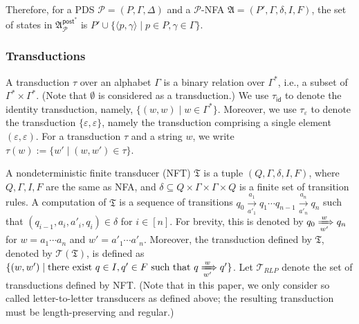 \documentclass[preprint,12pt]{elsarticle}
\newcommand\Pp{{\mathcal{P} }}
\newcommand\post{{\mathsf{post} }}
\newcommand{\id}{\mathsf{id}}
\newcommand\Aut{{\mathfrak{A} }}
\newcommand\Tran{{\mathfrak{T} }}
\newcommand\TLang{{\mathscr{T} }}
\newcommand\UTrans{{\mathscr{T}_{RLP} }}
\newcommand{\NFA}{\textsf{NFA}}
\newcommand{\NFT}{\textsf{NFT}}
\newcommand{\LTLNFT}{\textsf{L2LNFT}}
\newcommand{\tl}[1]{\color{magenta} {TL: #1 :LT} \color{black}}
\newcommand{\tl}[1]{}
\begin{document}
\smallskip

Therefore, for a PDS $\Pp=(P,\Gamma,\Delta)$ and a $\Pp$-NFA $\Aut = (P', \Gamma, \delta, I, F)$, the set of states in $\Aut^{\post^*}_\Pp$ is $P' \cup \{\langle p, \gamma \rangle \mid p \in P, \gamma \in \Gamma \}$.


\subsubsection{Transductions}
A transduction $\tau$ over an alphabet $\Gamma$ is a binary relation over $\Gamma^*$, i.e., a subset of $\Gamma^* \times \Gamma^*$. (Note that $\emptyset$ is considered as a transduction.)
We use $\tau_{\id}$ to denote the identity transduction, namely,  $\{(w,w) \mid w \in \Gamma^*\}$. 
Moreover, we use $\tau_\varepsilon$ to denote the transduction $\{\varepsilon, \varepsilon\}$, namely the transduction comprising a single element $(\varepsilon, \varepsilon)$.
For a transduction $\tau$ and a string $w$, we write $\tau(w):= \{w' \mid (w, w') \in \tau \}$.

A nondeterministic finite transducer  (\NFT) $\Tran$ is a tuple $(Q, \Gamma, \delta, I, F)$, 
where $Q, \Gamma, I, F$ are the same as \NFA, %
and %
$\delta \subseteq Q \times \Gamma \times \Gamma \times Q$ is a finite set of transition rules.
%
A computation of $\Tran$ is a sequence of transitions
$
q_0 \xrightarrow[a'_1]{a_1} q_1  %
\cdots q_{n-1} \xrightarrow[a'_n]{a_n} q_n 
$
such that $(q_{i-1}, a_i, a'_i, q_i) \in \delta$ for $i \in [n]$. For brevity, this is denoted by  $q_0 \xRightarrow[w']{w} q_n$ for $w= a_1 \cdots a_n$ and $w'= a'_1 \cdots a'_n$. %
Moreover, the transduction defined by $\Tran$, denoted by $\TLang(\Tran)$, is defined as $\{(w, w') \mid \mbox{there exist } q \in I, q' \in F \mbox{ such that } q \xRightarrow[w']{w} q'\}$. Let $\UTrans$ denote the set of transductions defined by \NFT. (Note that in this paper, we only consider so called letter-to-letter transducers as defined above; the resulting transduction must be length-preserving and regular.)
%
\end{document}
